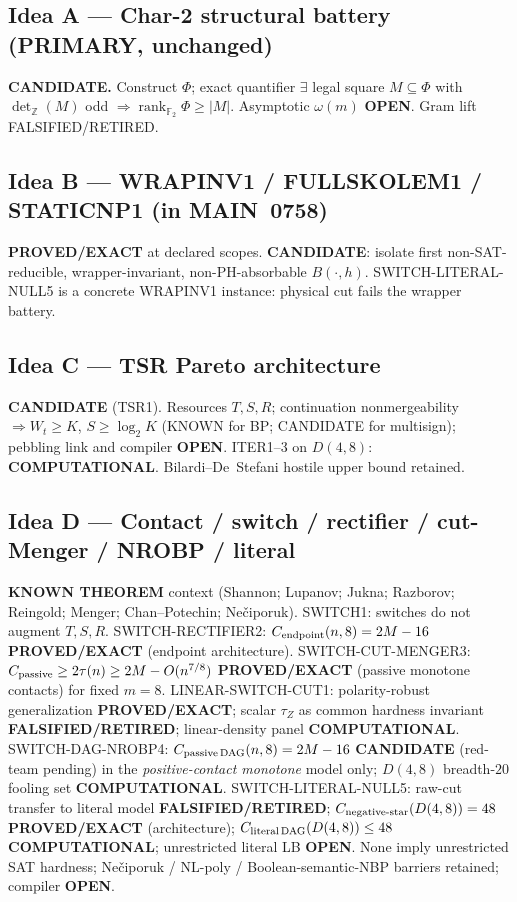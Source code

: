 \documentclass[11pt]{article}
\begin{document}
\subsection*{Idea A --- Char-2 structural battery (PRIMARY, unchanged)}
\textbf{CANDIDATE.} Construct $\Phi$; exact quantifier
$\exists$ legal square $M\subseteq\Phi$ with $\det_{\mathbb Z}(M)$ odd
$\Rightarrow\operatorname{rank}_{\mathbb F_2}\Phi\ge|M|$. Asymptotic $\omega(m)$ \textbf{OPEN}.
Gram lift FALSIFIED/RETIRED.

\subsection*{Idea B --- WRAPINV1 / FULLSKOLEM1 / STATICNP1 (in MAIN~0758)}
\textbf{PROVED/EXACT} at declared scopes.
\textbf{CANDIDATE}: isolate first non-SAT-reducible, wrapper-invariant, non-PH-absorbable $B(\cdot,h)$.
SWITCH-LITERAL-NULL5 is a concrete WRAPINV1 instance: physical cut fails the wrapper battery.

\subsection*{Idea C --- TSR Pareto architecture}
\textbf{CANDIDATE} (TSR1). Resources $T,S,R$; continuation nonmergeability $\Rightarrow W_t\ge K$,
$S\ge\log_2 K$ (KNOWN for BP; CANDIDATE for multisign); pebbling link and compiler \textbf{OPEN}.
ITER1--3 on $D(4,8)$: \textbf{COMPUTATIONAL}. Bilardi--De~Stefani hostile upper bound retained.

\subsection*{Idea D --- Contact / switch / rectifier / cut-Menger / NROBP / literal}
\textbf{KNOWN THEOREM} context (Shannon; Lupanov; Jukna; Razborov; Reingold; Menger;
Chan--Potechin; Ne\v{c}iporuk).
SWITCH1: switches do not augment $T,S,R$.
SWITCH-RECTIFIER2: $C_{\rm endpoint}(n,8)=2M-16$ \textbf{PROVED/EXACT} (endpoint architecture).
SWITCH-CUT-MENGER3: $C_{\rm passive}\ge 2\tau(n)\ge 2M-O(n^{7/8})$ \textbf{PROVED/EXACT}
(passive monotone contacts) for fixed $m=8$.
LINEAR-SWITCH-CUT1: polarity-robust generalization \textbf{PROVED/EXACT}; scalar $\tau_Z$ as
common hardness invariant \textbf{FALSIFIED/RETIRED}; linear-density panel \textbf{COMPUTATIONAL}.
SWITCH-DAG-NROBP4: $C_{\rm passive\,DAG}(n,8)=2M-16$ \textbf{CANDIDATE} (red-team pending)
in the \emph{positive-contact monotone} model only; $D(4,8)$ breadth-$20$ fooling set
\textbf{COMPUTATIONAL}.
SWITCH-LITERAL-NULL5: raw-cut transfer to literal model \textbf{FALSIFIED/RETIRED};
$C_{\rm negative\textrm{-}star}(D(4,8))=48$ \textbf{PROVED/EXACT} (architecture);
$C_{\rm literal\,DAG}(D(4,8))\le 48$ \textbf{COMPUTATIONAL}; unrestricted literal LB \textbf{OPEN}.
None imply unrestricted SAT hardness; Ne\v{c}iporuk / NL-poly / Boolean-semantic-NBP barriers
retained; compiler \textbf{OPEN}.
\end{document}
